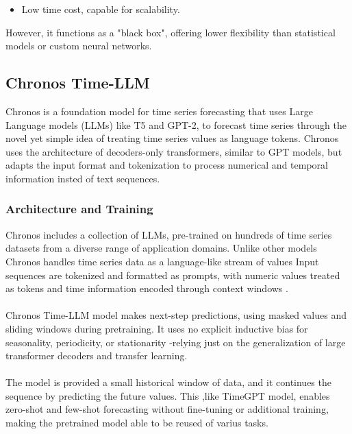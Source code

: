 \documentclass{article}
\begin{document}
\begin{itemize}
    \item Low time cost, capable for scalability.
\end{itemize}

However, it functions as a "black box", offering lower flexibility than statistical models or custom neural networks.


\subsection{Chronos Time-LLM}
Chronos is a foundation model for time series forecasting that uses Large Language models (LLMs) like T5 and GPT-2, to forecast time series through the novel yet simple idea of treating time series values as language tokens. Chronos uses the architecture of decoders-only transformers, similar to GPT models, but adapts the input format and  tokenization to process numerical and temporal information insted of text sequences.

\subsubsection{Architecture and Training}
Chronos includes a collection of LLMs, pre-trained on hundreds of time series datasets from a diverse range of application domains. Unlike other models Chronos handles time series data as a language-like stream of values Input sequences are tokenized and formatted as prompts, with numeric values treated as tokens and time information encoded through context windows \cite{ansari2024chronos}.\\
\\
Chronos Time-LLM model makes next-step predictions, using masked values and sliding windows during pretraining. It uses no explicit inductive bias for seasonality, periodicity, or stationarity -relying just on the generalization of large transformer decoders and transfer learning.\\
\\
The model is provided a small historical window of data, and it continues the sequence by predicting the future values. This ,like TimeGPT model, enables zero-shot and few-shot forecasting without fine-tuning or additional training, making the pretrained model able to be reused of varius tasks.
\end{document}
